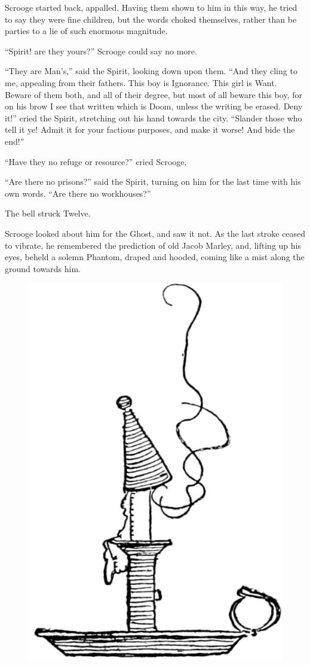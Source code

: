 \documentclass[paper=5.5in:8.5in,BCOR=7mm,twoside,DIV=calc,12pt,usegeometry]{scrbook} %
\begin{document}
Scrooge started back, appalled. Having them shown to him in this way, he tried to say they were fine children, but the words choked themselves, rather than be parties to a lie of such enormous magnitude.

\enquote{Spirit! are they yours?} Scrooge could say no more.

\enquote{They are Man's,} said the Spirit, looking down upon them. \enquote{And they cling to me, appealing from their fathers. This boy is Ignorance. This girl is Want. Beware of them both, and all of their degree, but most of all beware this boy, for on his brow I see that written which is Doom, unless the writing be erased. Deny it!} cried the Spirit, stretching out his hand towards the city. \enquote{Slander those who tell it ye! Admit it for your factious purposes, and make it worse! And bide the end!}

\enquote{Have they no refuge or resource?} cried Scrooge.

\enquote{Are there no prisons?} said the Spirit, turning on him for the last time with his own words. \enquote{Are there no workhouses?}

The bell struck Twelve.

Scrooge looked about him for the Ghost, and saw it not. As the last stroke ceased to vibrate, he remembered the prediction of old Jacob Marley, and, lifting up his eyes, beheld a solemn Phantom, draped and hooded, coming like a mist along the ground towards him.

\begin{figure}[tbh]
\centering
\includegraphics[width=.5\linewidth]{candleimproved}
\end{figure}
\end{document}
